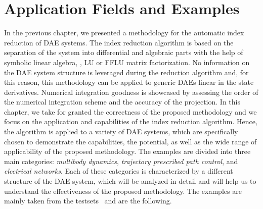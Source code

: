 
\chapter{Application Fields and Examples}
\label{chap5:applications}

In the previous chapter, we presented a methodology for the automatic index reduction of \ac{DAE} systems. The index reduction algorithm is based on the separation of the system into differential and algebraic parts with the help of symbolic linear algebra, \ie{}, \ac{LU} or \ac{FFLU} matrix factorization. No information on the \ac{DAE} system structure is leveraged during the reduction algorithm and, for this reason, this methodology can be applied to generic \acp{DAE} linear in the state derivatives. Numerical integration goodness is showcased by assessing the order of the numerical integration scheme and the accuracy of the projection. In this chapter, we take for granted the correctness of the proposed methodology and we focus on the application and capabilities of the index reduction algorithm. Hence, the algorithm is applied to a variety of \ac{DAE} systems, which are specifically chosen to demonstrate the capabilities, the potential, as well as the wide range of applicability of the proposed methodology. The examples are divided into three main categories: \emph{multibody dynamics}, \emph{trajectory prescribed path control}, and \emph{electrical networks}. Each of these categories is characterized by a different structure of the \ac{DAE} system, which will be analyzed in detail and will help us to understand the effectiveness of the proposed methodology. The examples are mainly taken from the testsets~\cite{lioen1998test, mazzia2003test, mazzia2008test, mazzia2012test} and are the following.
%
